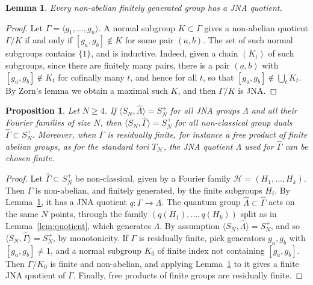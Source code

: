 \documentclass[11pt]{amsart}
\newtheorem{proposition}[theorem]{Proposition}
\newtheorem{lemma}[theorem]{Lemma}
\theoremstyle{definition}
\theoremstyle{remark}
\theoremstyle{plain}
\numberwithin{equation}{section}
\numberwithin{table}{section}
\begin{document}
\begin{lemma}\label{lem:zorn}
Every non-abelian finitely generated group has a JNA quotient.
\end{lemma}

\begin{proof}
Let $\Gamma=\langle g_1,\dots,g_n\rangle$. A normal subgroup $K\subset\Gamma$ gives a non-abelian quotient $\Gamma/K$ if and only if $[g_a,g_b]\notin K$ for some pair $(a,b)$. The set of such normal subgroups contains $\{1\}$, and is inductive. Indeed, given a chain $(K_t)$ of such subgroups, since there are finitely many pairs, there is a pair $(a,b)$ with $[g_a,g_b]\notin K_t$ for cofinally many $t$, and hence for all $t$, so that $[g_a,g_b]\notin\bigcup_tK_t$. By Zorn's lemma we obtain a maximal such $K$, and then $\Gamma/K$ is JNA.
\end{proof}

\begin{proposition}\label{prop:reduction}
Let $N\ge4$. If $\langle S_N,\widehat\Lambda\rangle=S_N^+$ for all JNA groups $\Lambda$ and all their Fourier families of size $N$, then $\langle S_N,\widehat\Gamma\rangle=S_N^+$ for all non-classical group duals $\widehat\Gamma\subset S_N^+$. Moreover, when $\Gamma$ is residually finite, for instance a free product of finite abelian groups, as for the standard tori $T_{\mathcal H}$, the JNA quotient $\Lambda$ used for $\widehat\Gamma$ can be chosen finite.
\end{proposition}

\begin{proof}
Let $\widehat\Gamma\subset S_N^+$ be non-classical, given by a Fourier family $\mathcal H=(H_1,\dots,H_k)$. Then $\Gamma$ is non-abelian, and finitely generated, by the finite subgroups $H_i$. By Lemma~\ref{lem:zorn}, it has a JNA quotient $q:\Gamma\to\Lambda$. The quantum group $\widehat\Lambda\subset\widehat\Gamma$ acts on the same $N$ points, through the family $(q(H_1),\dots,q(H_k))$ split as in Lemma~\ref{lem:quotient}, which generates $\Lambda$. By assumption $\langle S_N,\widehat\Lambda\rangle=S_N^+$, and so $\langle S_N,\widehat\Gamma\rangle=S_N^+$, by monotonicity. If $\Gamma$ is residually finite, pick generators $g_a,g_b$ with $[g_a,g_b]\ne1$, and a normal subgroup $K_0$ of finite index not containing $[g_a,g_b]$. Then $\Gamma/K_0$ is finite and non-abelian, and applying Lemma~\ref{lem:zorn} to it gives a finite JNA quotient of $\Gamma$. Finally, free products of finite groups are residually finite.
\end{proof}
\end{document}
